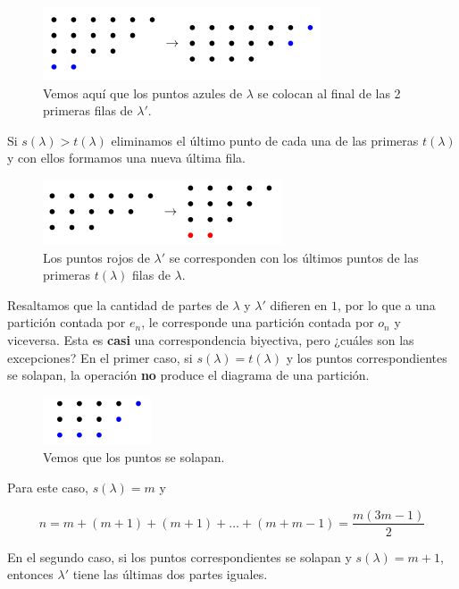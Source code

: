 \begin{figure}
    \centering
    \includegraphics[scale=0.65]{img/ferrers5.png}
    \caption{Vemos aquí que los puntos azules de $\lambda$ se colocan al final de las 2 primeras filas de $\lambda'$.}
    \label{fig:ferrers5}
\end{figure}

Si $s(\lambda) > t(\lambda)$ eliminamos el último punto de cada una de las primeras $t(\lambda)$ y con ellos formamos una nueva última fila.

\begin{figure}
    \centering
    \includegraphics[scale=0.65]{img/ferrers6.png}
    \caption{Los puntos rojos de $\lambda'$ se corresponden con los últimos puntos de las primeras $t(\lambda)$ filas de $\lambda$.}
    \label{fig:ferrers6}
\end{figure}

Resaltamos que la cantidad de partes de $\lambda$ y $\lambda'$ difieren en $1$, por lo que a una partición contada por $e_n$, le corresponde una partición contada por $o_n$ y viceversa. Esta es \textbf{casi} una correspondencia biyectiva, pero ¿cuáles son las excepciones? En el primer caso, si $s(\lambda) = t(\lambda)$ y los puntos correspondientes se solapan, la operación \textbf{no} produce el diagrama de una partición.

\begin{figure}
    \centering
    \includegraphics[scale=0.65]{img/ferrers7.png}
    \caption{Vemos que los puntos se solapan.}
    \label{fig:ferrers7}
\end{figure}

Para este caso, $s(\lambda) = m$ y

\[
n = m + (m+1) + (m+1) + \dots + (m+m-1) = \frac{m(3m-1)}{2}
\]

En el segundo caso, si los puntos correspondientes se solapan y $s(\lambda) = m+1$, entonces $\lambda'$ tiene las últimas dos partes iguales.

